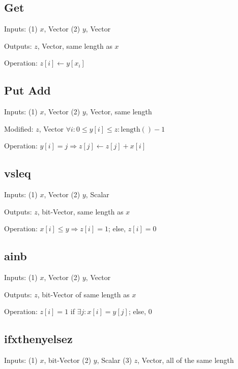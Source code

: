 \subsection{Get}
\bi
\item Inputs: (1) \(x\), Vector  (2) \(y\), Vector

\item Outputs: \(z\), Vector, same length as \(x\)

\item Operation: \(z[i] \leftarrow y[x_i]\)
\ei

\subsection{Put Add}
\bi
\item Inputs: (1) \(x\), Vector  (2) \(y\), Vector, same length

\item Modified: \(z\), Vector \(\forall i: 0 \leq y[i] \leq z:\mathrm{length}() - 1\)

\item Operation: \(y[i] = j \Rightarrow z[j] \leftarrow z[j] + x[i]\)
\ei


\subsection{vsleq}
\bi
\item Inputs: (1) \(x\), Vector  (2) \(y\), Scalar

\item Outputs: \(z\), bit-Vector, same length as \(x\)

\item Operation: \(x[i] \leq y \Rightarrow z[i] = 1\); else, \(z[i] = 0\)
\ei

\subsection{ainb}
\bi
\item Inputs: (1) \(x\), Vector  (2) \(y\), Vector

\item Outputs: \(z\), bit-Vector of same length as \(x\)

\item Operation: \(z[i] = 1\) if \(\exists j: x[i] = y[j]\); else, 0

\ei

\subsection{ifxthenyelsez}
\bi
\item Inputs: (1) \(x\), bit-Vector (2) \(y\), Scalar (3) \(z\), Vector, all of
the same length

